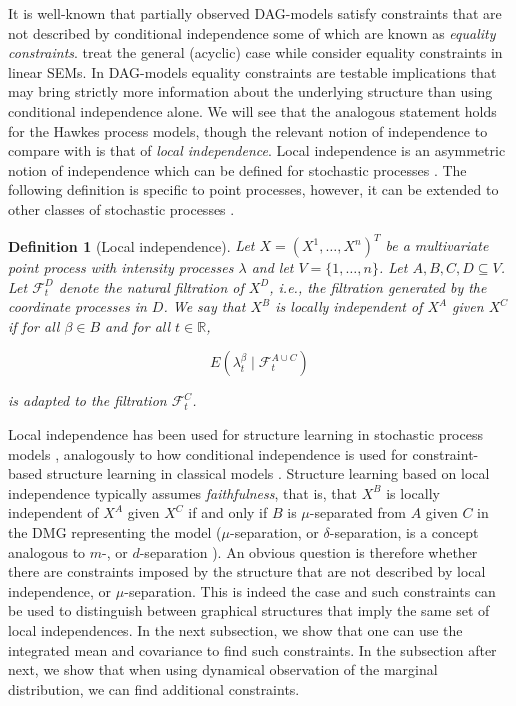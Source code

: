\documentclass[accepted]{uai2021} %
\newtheorem{defn}[thm]{Definition}
\begin{document}
It is well-known that partially observed DAG-models satisfy 
constraints that 
are not described by conditional independence some of which are known as 
\emph{equality constraints}. \cite{richardson2017} treat the general (acyclic) 
case 
while \cite{chen2014, chenNIPS2016} consider equality constraints in linear 
SEMs. In DAG-models equality constraints are testable implications that may 
bring strictly more information about the underlying structure than using 
conditional independence alone. We will see that the analogous statement holds 
for the Hawkes process models, though the relevant notion of independence to 
compare with is 
that of \emph{local independence}. Local independence is an asymmetric notion 
of independence which can be defined 
for stochastic processes \citep{schweder1970, aalen1987, didelez2000, 
didelez2008}. The following definition is specific to point processes, however, 
it can be extended to other classes of stochastic processes 
\citep{aalen1987,didelez2006,mogensenUAI2018,mogensen2018}.

\begin{defn}[Local independence]
	Let $X = (X^1,\ldots,X^n)^T$ be a multivariate point process with intensity 
	processes $\lambda$ and let $V=\{1,\ldots,n\}$. Let $A,B,C,D \subseteq V$. 
	Let $\mathcal{F}_t^D$ denote the natural filtration of $X^D$, i.e., the 
	filtration generated by the coordinate processes in $D$. We say that $X^B$ 
	is \emph{locally independent of $X^A$ given $X^C$} if for all $\beta\in B$ 
	and 
	for all $t\in \mathbb{R}$,
	
	$$
	E(\lambda_t^\beta \mid \mathcal{F}_t^{A\cup C})
	$$
	
	is adapted to the filtration $\mathcal{F}_t^C$.
	\label{def:li}
\end{defn}

Local independence has been used for structure learning in stochastic process 
models 
\citep{meek2014, mogensenUAI2018, thams2019, mogensenUAI2020}, analogously to 
how conditional independence is used for 
constraint-based structure learning in classical models \citep{spirtes1993, 
spirtesSearchChapHandbook}. Structure learning based on local independence 
typically assumes 
\emph{faithfulness}, that is, that $X^B$ is locally independent of $X^A$ given 
$X^C$ if and only if $B$ is $\mu$-separated from $A$ given $C$ in the DMG 
representing the model
($\mu$-separation, or $\delta$-separation, is a concept analogous to $m$-, or 
$d$-separation \citep{didelez2000, didelez2008, mogensen2018}). An obvious 
question is therefore whether there are constraints imposed by the 
 structure that are not described by local independence, or $\mu$-separation. 
 This is indeed the 
 case 
 and such constraints can be used to distinguish between graphical structures 
 that imply the same set of local independences. In the next subsection, we 
 show that one can use the integrated mean and covariance to find such 
 constraints. In the subsection after next, we show that when using
 dynamical observation of the marginal distribution, we can find additional 
 constraints.
\end{document}
